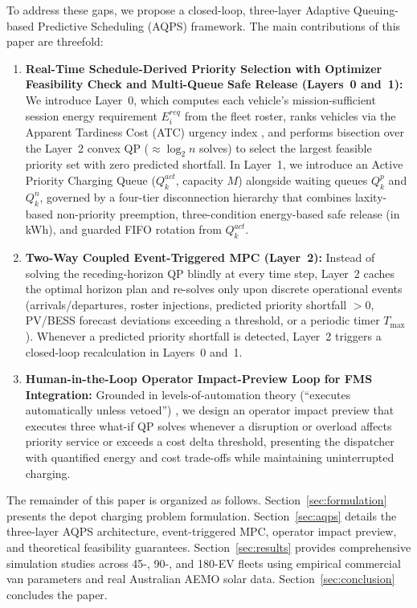 \documentclass[final,3p,times,twocolumn]{elsarticle}
\begin{document}
To address these gaps, we propose a closed-loop, three-layer Adaptive Queuing-based Predictive Scheduling (AQPS) framework. The main contributions of this paper are threefold:
\begin{enumerate}
    \item \textbf{Real-Time Schedule-Derived Priority Selection with Optimizer Feasibility Check and Multi-Queue Safe Release (Layers~0 and~1):} We introduce Layer~0, which computes each vehicle's mission-sufficient session energy requirement $E_i^{req}$ from the fleet roster, ranks vehicles via the Apparent Tardiness Cost (ATC) urgency index \cite{vepsalainen1987priority,valente2007heuris}, and performs bisection over the Layer~2 convex QP ($\approx \log_2 n$ solves) to select the largest feasible priority set with zero predicted shortfall. In Layer~1, we introduce an Active Priority Charging Queue ($Q_k^{act}$, capacity $M$) alongside waiting queues $Q_k^p$ and $Q_k^n$, governed by a four-tier disconnection hierarchy that combines laxity-based non-priority preemption, three-condition energy-based safe release (in kWh), and guarded FIFO rotation from $Q_k^{act}$.
    \item \textbf{Two-Way Coupled Event-Triggered MPC (Layer~2):} Instead of solving the receding-horizon QP blindly at every time step, Layer~2 caches the optimal horizon plan and re-solves only upon discrete operational events (arrivals/departures, roster injections, predicted priority shortfall $>0$, PV/BESS forecast deviations exceeding a threshold, or a periodic timer $T_{\max}$). Whenever a predicted priority shortfall is detected, Layer~2 triggers a closed-loop recalculation in Layers~0 and~1.
    \item \textbf{Human-in-the-Loop Operator Impact-Preview Loop for FMS Integration:} Grounded in levels-of-automation theory (``executes automatically unless vetoed'') \cite{parasuraman2000model,parasuraman2010complacency}, we design an operator impact preview that executes three what-if QP solves whenever a disruption or overload affects priority service or exceeds a cost delta threshold, presenting the dispatcher with quantified energy and cost trade-offs while maintaining uninterrupted charging.
\end{enumerate}

The remainder of this paper is organized as follows. Section~\ref{sec:formulation} presents the depot charging problem formulation. Section~\ref{sec:aqps} details the three-layer AQPS architecture, event-triggered MPC, operator impact preview, and theoretical feasibility guarantees. Section~\ref{sec:results} provides comprehensive simulation studies across 45-, 90-, and 180-EV fleets using empirical commercial van parameters and real Australian AEMO solar data. Section~\ref{sec:conclusion} concludes the paper.
\end{document}
